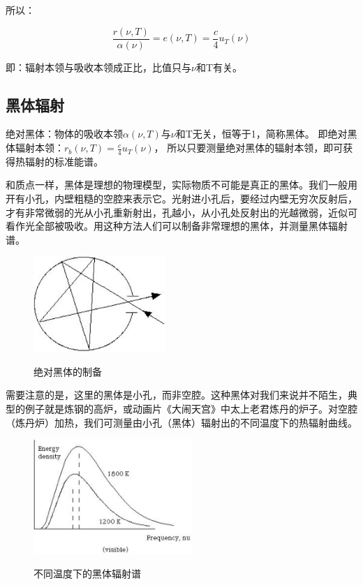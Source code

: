 所以：

\begin{equation}
\frac{{r(\nu ,T)}}{{\alpha (\nu )}} = e(\nu ,T) = \frac{c}{4}u_T (\nu )
\end{equation}

即：辐射本领与吸收本领成正比，比值只与$\nu $和T有关。

\subsection{黑体辐射}

绝对黑体：物体的吸收本领$\alpha (\nu
,T)$与$\nu$和T无关，恒等于1，简称黑体。 即绝对黑体辐射本领：$r_b
(\nu ,T) = \frac{c}{4}u_T (\nu )$，
所以只要测量绝对黑体的辐射本领，即可获得热辐射的标准能谱。


和质点一样，黑体是理想的物理模型，实际物质不可能是真正的黑体。我们一般用开有小孔，内壁粗糙的空腔来表示它。光射进小孔后，要经过内壁无穷次反射后，才有非常微弱的光从小孔重新射出，孔越小，从小孔处反射出的光越微弱，近似可看作光全部被吸收。用这种方法人们可以制备非常理想的黑体，并测量黑体辐射谱。

\begin{figure}[h]
\begin{center}
  \includegraphics[width=5cm]{Duality/2-2.ps}\\
  \caption{绝对黑体的制备}\label{blackbody}
\end{center}
\end{figure}

需要注意的是，这里的黑体是小孔，而非空腔。这种黑体对我们来说并不陌生，典型的例子就是炼钢的高炉，或动画片《大闹天宫》中太上老君炼丹的炉子。对空腔（炼丹炉）加热，我们可测量由小孔（黑体）辐射出的不同温度下的热辐射曲线。

\begin{figure}[h]
\begin{center}
  \includegraphics[width=6cm]{Duality/2-3.ps}\\
  \caption{不同温度下的黑体辐射谱}\label{blackbody radiation}
\end{center}
\end{figure}

